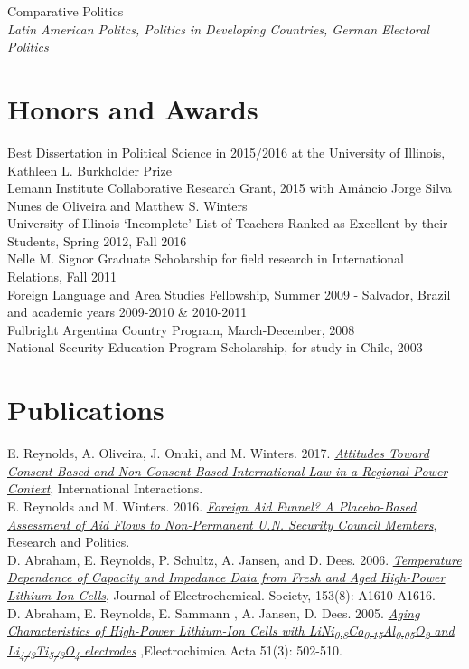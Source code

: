 \documentclass[margin, 10pt]{CVStyleTemplate}\usepackage[]{graphicx}\usepackage[]{color}
\begin{document}
\begin{resume}
Comparative Politics\\
\emph{Latin American Politcs, Politics in Developing Countries, German Electoral Politics}

\section{Honors and Awards}%
Best Dissertation in Political Science in 2015/2016 at the University of Illinois, Kathleen L. Burkholder Prize  \\[6pt]
Lemann Institute Collaborative Research Grant, 2015 with Am\^{a}ncio Jorge Silva Nunes de Oliveira and Matthew S. Winters\\[6pt]%
University of Illinois `Incomplete' List of Teachers Ranked as Excellent by their Students, Spring 2012, Fall 2016\\[6pt]%
Nelle M. Signor Graduate Scholarship for field research in International Relations, Fall 2011\\[6pt]%
Foreign Language and Area Studies Fellowship, Summer 2009 - Salvador, Brazil and academic years 2009-2010 \& 2010-2011\\[6pt]%
Fulbright Argentina Country Program, March-December, 2008\\[6pt]%
National Security Education Program Scholarship, for study in Chile, 2003\\[6pt]%



\section{Publications}

E. Reynolds, A. Oliveira, J. Onuki,
 and M. Winters. 2017. \emph{\href{http://www.tandfonline.com/doi/abs/10.1080/03050629.2018.1408012}{Attitudes Toward Consent-Based and Non-Consent-Based International Law in a Regional Power Context}}, International Interactions.\\[6pt]
E. Reynolds and M. Winters. 2016. \emph{\href{http://rap.sagepub.com/content/3/1/2053168015626167}{Foreign Aid Funnel? A Placebo-Based Assessment of Aid Flows to Non-Permanent U.N. Security Council Members}}, Research and Politics. \\[6pt]%
D. Abraham, E. Reynolds, P. Schultz, A. Jansen, and D. Dees. 2006. \emph{\href{http://jes.ecsdl.org/content/153/8/A1610.abstract}{Temperature Dependence of Capacity and Impedance Data from Fresh and Aged High-Power Lithium-Ion Cells}}, Journal of Electrochemical. Society, 153(8): A1610-A1616. \\[6pt]%
D. Abraham, E. Reynolds, E. Sammann , A. Jansen,  D. Dees. 2005. \emph{\href{http://www.sciencedirect.com/science/article/pii/S0013468605004433}{Aging Characteristics of High-Power Lithium-Ion Cells with LiNi\textsubscript{0.8}Co\textsubscript{0.15}Al\textsubscript{0.05}O\textsubscript{2} and Li\textsubscript{4/3}Ti\textsubscript{5/3}O\textsubscript{4} electrodes}} ,Electrochimica Acta 51(3): 502-510.\\[6pt]%


\end{resume}
\end{document}
